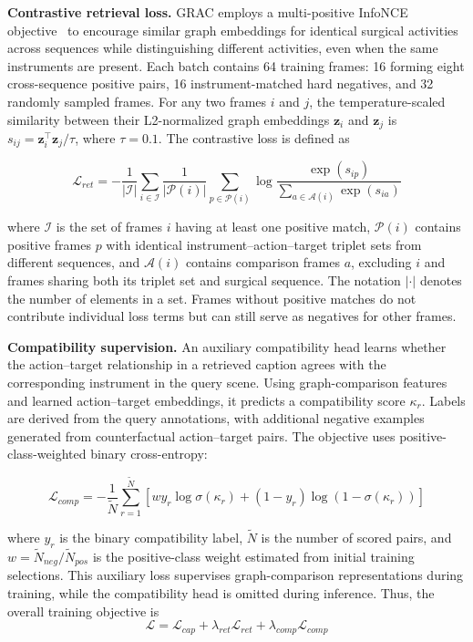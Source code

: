 \documentclass[11pt]{article}
\begin{document}
\textbf{Contrastive retrieval loss.} GRAC employs a multi-positive InfoNCE objective~\cite{b23} to encourage similar graph embeddings for identical surgical activities across sequences while distinguishing different activities, even when the same instruments are present. Each batch contains 64 training frames: 16 forming eight cross-sequence positive pairs, 16 instrument-matched hard negatives, and 32 randomly sampled frames. For any two frames $i$ and $j$, the temperature-scaled similarity between their L2-normalized graph embeddings $\mathbf{z}_i$ and $\mathbf{z}_j$ is $s_{ij}=\mathbf{z}_i^\top\mathbf{z}_j/\tau$, where $\tau=0.1$. The contrastive loss is defined as

\begin{equation}
\mathcal{L}_{ret} =
-\frac{1}{|\mathcal{I}|}
\sum_{i\in\mathcal{I}}
\frac{1}{|\mathcal{P}(i)|}
\sum_{p\in\mathcal{P}(i)}
\log
\frac{\exp(s_{ip})}
{\sum_{a\in\mathcal{A}(i)}\exp(s_{ia})}
\label{eq2}
\end{equation}

where $\mathcal{I}$ is the set of frames $i$ having at least one positive match, $\mathcal{P}(i)$ contains positive frames $p$ with identical instrument--action--target triplet sets from different sequences, and $\mathcal{A}(i)$ contains comparison frames $a$, excluding $i$ and frames sharing both its triplet set and surgical sequence. The notation $|\cdot|$ denotes the number of elements in a set. Frames without positive matches do not contribute individual loss terms but can still serve as negatives for other frames.


\textbf{Compatibility supervision.} An auxiliary compatibility head learns whether the action–target relationship in a retrieved caption agrees with the corresponding instrument in the query scene. Using graph-comparison features and learned action–target embeddings, it predicts a compatibility score $\kappa_r$. Labels are derived from the query annotations, with additional negative examples generated from counterfactual action–target pairs. The objective uses positive-class-weighted binary cross-entropy:

\begin{equation}
\mathcal{L}_{comp} = -\frac{1}{\widetilde{N}}\sum_{r=1}^{\widetilde{N}}
\left[
w y_r\log\sigma(\kappa_r)
+(1-y_r)\log(1-\sigma(\kappa_r))
\right]
\label{eq7}
\end{equation}

\noindent where $y_r$ is the binary compatibility label, $\widetilde{N}$ is the number of scored pairs, and $w=\widetilde{N}_{neg}/\widetilde{N}_{pos}$ is the positive-class weight estimated from initial training selections. This auxiliary loss supervises graph-comparison representations during training, while the compatibility head is omitted during inference.
Thus, the overall training objective is
\begin{equation}
\mathcal{L} = \mathcal{L}_{cap}
+ \lambda_{ret}\mathcal{L}_{ret}
+ \lambda_{comp}\mathcal{L}_{comp}
\label{eq8}
\end{equation}
\end{document}

